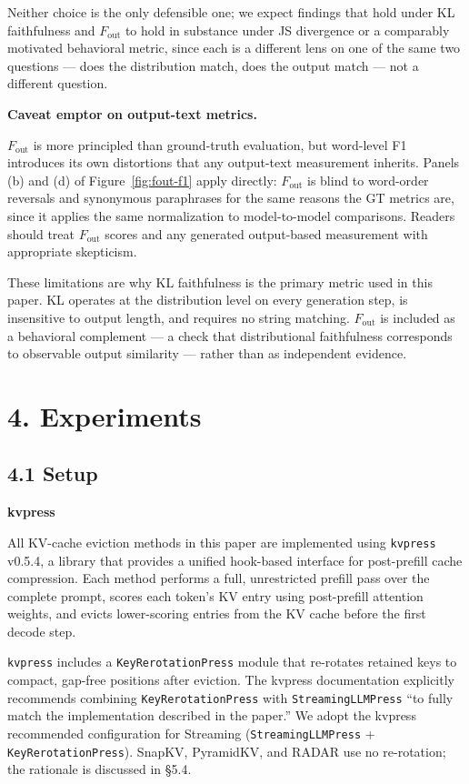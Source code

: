 \documentclass[10pt,letterpaper]{article}
\begin{document}
Neither choice is the only defensible one; we
expect findings that hold under KL faithfulness and \(F_{\text{out}}\)
to hold in substance under JS divergence or a comparably motivated
behavioral metric, since each is a different lens on one of the same two
questions --- does the distribution match, does the output match --- not
a different question.

\textbf{Caveat emptor on output-text metrics.}

\nopagebreak
\(F_{\text{out}}\) is more principled than ground-truth evaluation, but word-level F1
introduces its own distortions that any output-text measurement
inherits. Panels (b) and (d) of Figure~\ref{fig:fout-f1} apply directly:
\(F_{\text{out}}\) is blind to word-order reversals and synonymous paraphrases for
the same reasons the GT metrics are, since it applies the same normalization to
model-to-model comparisons. Readers should treat \(F_{\text{out}}\) scores and any
generated output-based measurement with appropriate skepticism.


These limitations are why KL faithfulness is the primary metric used in
this paper. KL operates at the distribution level on every generation
step, is insensitive to output length, and requires no string matching.
\(F_{\text{out}}\) is included as a behavioral complement --- a check
that distributional faithfulness corresponds to observable output
similarity --- rather than as independent evidence.


\hypertarget{main-experiments}{%
\section{4. Experiments}\label{main-experiments}}

\hypertarget{setup-1}{%
\subsection{4.1 Setup}\label{setup-1}}

\textbf{kvpress}

All KV-cache eviction methods in this paper are implemented using
\texttt{kvpress} v0.5.4, a library that provides a unified hook-based
interface for post-prefill cache compression. Each method performs a
full, unrestricted prefill pass over the complete prompt, scores each
token's KV entry using post-prefill attention weights, and evicts
lower-scoring entries from the KV cache before the first decode step.

\texttt{kvpress} includes a \texttt{KeyRerotationPress} module that
re-rotates retained keys to compact, gap-free positions after eviction.
The kvpress documentation explicitly recommends combining
\texttt{KeyRerotationPress} with \texttt{StreamingLLMPress} ``to fully
match the implementation described in the paper.'' We adopt the kvpress
recommended configuration for Streaming (\texttt{StreamingLLMPress} +
\texttt{KeyRerotationPress}). SnapKV, PyramidKV, and RADAR use no
re-rotation; the rationale is discussed in §5.4.
\end{document}
